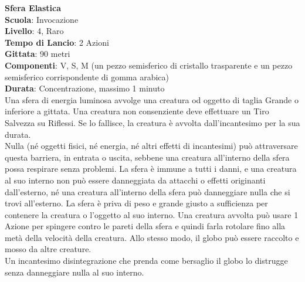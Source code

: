 \begin{multicols}{2}
\medskip\textbf{Sfera Elastica}\\
\textbf{Scuola}: Invocazione\\
\textbf{Livello}: 4, Raro\\
\textbf{Tempo di Lancio}: 2 Azioni\\
\textbf{Gittata}: 90 metri\\
\textbf{Componenti}: V, S, M (un pezzo semisferico di cristallo trasparente e un pezzo semisferico corrispondente di gomma arabica)\\
\textbf{Durata}: Concentrazione, massimo 1 minuto\\
Una sfera di energia luminosa avvolge una creatura od oggetto di taglia Grande o inferiore a gittata. Una creatura non consenziente deve effettuare un Tiro Salvezza su Riflessi. Se lo fallisce, la creatura è avvolta dall'incantesimo per la sua durata.\\
Nulla (né oggetti fisici, né energia, né altri effetti di incantesimi) può attraversare questa barriera, in entrata o uscita, sebbene una creatura all'interno della sfera possa respirare senza problemi. La sfera è immune a tutti i danni, e una creatura al suo interno non può essere danneggiata da attacchi o effetti originanti dall'esterno, né una creatura all'interno della sfera può danneggiare nulla che si trovi all'esterno. La sfera è priva di peso e grande giusto a sufficienza per contenere la creatura o l'oggetto al suo interno. Una creatura avvolta può usare 1 Azione per spingere contro le pareti della sfera e quindi farla rotolare fino alla metà della velocità della creatura. Allo stesso modo, il globo può essere raccolto e mosso da altre creature.\\
Un incantesimo disintegrazione che prenda come bersaglio il globo lo distrugge senza danneggiare nulla al suo interno.


\end{multicols}
